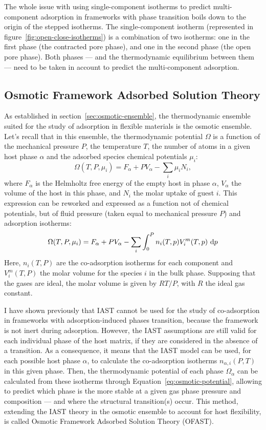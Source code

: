 \documentclass[thesis]{subfiles}
\begin{document}
The whole issue with using single-component isotherms to predict multi-component
adsorption in frameworks with phase transition boils down to the origin of the
stepped isotherms. The single-component isotherm (represented in
figure~\ref{fig:open-close-isotherms}) is a combination of two isotherms: one in
the first phase (the contracted pore phase), and one in the second phase (the
open pore phase). Both phases --- and the thermodynamic equilibrium between them
--- need to be taken in account to predict the multi-component adsorption.

\subsection{Osmotic Framework Adsorbed Solution Theory}

As established in section~\ref{sec:osmotic-ensemble}, the thermodynamic ensemble
suited for the study of adsorption in flexible materials is the osmotic
ensemble. Let's recall that in this ensemble, the thermodynamic potential
$\Omega$ is a function of the mechanical pressure $P$, the temperature $T$, the
number of atoms in a given host phase $\alpha$ and the adsorbed species chemical
potentials $\mu_i$: \[\Omega(T, P, \mu_i) = F_\alpha + P V_\alpha - \sum_i \mu_i
N_i,\] where $F_\alpha$ is the Helmholtz free energy of the empty host in phase
$\alpha$, $V_\alpha$ the volume of the host in this phase, and $N_i$ the molar
uptake of guest $i$. This expression can be reworked and expressed as a function
not of chemical potentials, but of fluid pressure (taken equal to mechanical
pressure $P$) and adsorption isotherms:\cite{Coudert2008} \[
\label{eq:osmotic-potential}\Omega(T, P, \mu_i) = F_\alpha + P V_\alpha - \sum_i
\int_0^P n_i(T, p) V^m_i(T, p) \ \text{d} p\] Here, $n_i(T,P)$ are the co-adsorption
isotherms for each component and $V^m_i(T,P)$ the molar volume for the species
$i$ in the bulk phase. Supposing that the gases are ideal, the molar volume is
given by $RT/P$, with $R$ the ideal gas constant.

I have shown previously that IAST cannot be used for the study of co-adsorption
in frameworks with adsorption-induced phases transition, because the framework
is not inert during adsorption. However, the IAST assumptions are still valid
for each individual phase of the host matrix, if they are considered in the
absence of a transition. As a consequence, it means that the IAST model can be
used, for each possible host phase $\alpha$, to calculate the co-adsorption
isotherms $n_{\alpha,i}(P,T)$ in this given phase. Then, the thermodynamic
potential of each phase $\Omega_{\alpha}$ can be calculated from these isotherms
through Equation~\eqref{eq:osmotic-potential}, allowing to predict which phase is
the more stable at a given gas phase pressure and composition --- and where the
structural transition(s) occur. This method, extending the IAST theory in the
osmotic ensemble to account for host flexibility, is called Osmotic Framework
Adsorbed Solution Theory (OFAST)\cite{Coudert2009, Coudert2010}.
\end{document}
